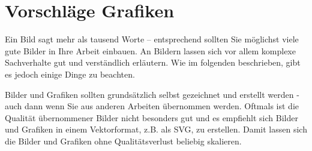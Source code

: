 \section{Vorschläge Grafiken}\label{sec:vorschlage-grafiken}
%
\glqq Ein Bild sagt mehr als tausend Worte\grqq{} -- entsprechend sollten Sie möglichst viele gute Bilder in Ihre Arbeit einbauen. An Bildern lassen sich vor allem komplexe Sachverhalte gut und verständlich erläutern. Wie im folgenden beschrieben, gibt es jedoch einige Dinge zu beachten.

Bilder und Grafiken sollten grundsätzlich selbst gezeichnet und erstellt werden - auch dann wenn Sie aus anderen Arbeiten übernommen werden. Oftmals ist die Qualität übernommener Bilder nicht besonders gut und es empfiehlt sich Bilder und Grafiken in einem Vektorformat, z.B. als SVG, zu erstellen. Damit lassen sich die Bilder und Grafiken ohne Qualitätsverlust beliebig skalieren.
